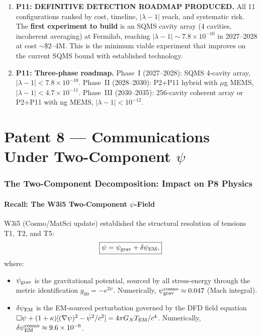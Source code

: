 \documentclass[11pt]{article}
\theoremstyle{definition}
\theoremstyle{remark}
\newcommand{\ee}[1]{\times 10^{#1}}
\newcommand{\psigrav}{\psi_{\rm grav}}
\newcommand{\dpsiEM}{\delta\psi_{\rm EM}}
\newcommand{\lamdiff}{|\lambda-1|}
\newcommand{\GN}{G_N}
\begin{document}
\begin{tcolorbox}[colback=blue!5!white, colframe=blue!60!black,
  title=CRITICAL W3i6 RESULTS --- READ FIRST]
\begin{enumerate}[nosep]
\item \textbf{P11: DEFINITIVE DETECTION ROADMAP PRODUCED.} All 11
  configurations ranked by cost, timeline, $\lamdiff$ reach, and systematic
  risk. The \textbf{first experiment to build} is an SQMS cavity array
  (4 cavities, incoherent averaging) at Fermilab, reaching
  $\lamdiff \sim 7.8\ee{-10}$ in 2027--2028 at cost $\sim$\$2--4M.
  This is the minimum viable experiment that improves on the current
  SQMS bound with established technology.

\item \textbf{P11: Three-phase roadmap.}
  Phase~I (2027--2028): SQMS 4-cavity array, $\lamdiff < 7.8\ee{-10}$.
  Phase~II (2028--2030): P2+P11 hybrid with $\mu$g MEMS, $\lamdiff < 4.7\ee{-11}$.
  Phase~III (2030--2035): 256-cavity coherent array or P2+P11 with ng MEMS,
  $\lamdiff < 10^{-12}$.

\end{enumerate}
\end{tcolorbox}


\part{Patent 8 --- Communications Under Two-Component $\psi$}

\section{The Two-Component Decomposition: Impact on P8 Physics}
\label{sec:two_component_p8}

\subsection{Recall: The W3i5 Two-Component $\psi$-Field}

W3i5 (Cosmo/MatSci update) established the structural resolution of tensions
T1, T2, and T5:
\begin{equation}
\boxed{
\psi = \psigrav + \dpsiEM,
}
\label{eq:two_component}
\end{equation}
where:
\begin{itemize}[nosep]
\item $\psigrav$ is the gravitational potential, sourced by all stress-energy
  through the metric identification $g_{00} = -e^{2\psi}$. Numerically,
  $\psigrav^{\rm cosmo} \approx 0.047$ (Mach integral).
\item $\dpsiEM$ is the EM-sourced perturbation governed by the DFD field
  equation $\Box\psi + (1+\kappa)[(\nabla\psi)^2 - \dot\psi^2/c^2]
  = 4\pi \GN T_{\rm EM}/c^4$. Numerically,
  $\dpsiEM^{\rm cosmo} \approx 9.6\ee{-6}$.
\end{itemize}
\end{document}
